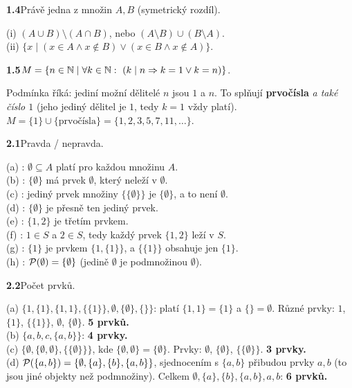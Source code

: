 \documentclass[11pt,a4paper]{article}
\newcommand{\zad}[2]{\par\Needspace*{4cm}\vspace{1.1em}\noindent\textcolor{accent}{\sffamily\bfseries #1}\enspace #2\par}
\begin{document}
\zad{1.4}{Právě jedna z množin $A,B$ (symetrický rozdíl).}
\begin{reseni}
(i) $(A\cup B)\setminus(A\cap B)$, nebo $(A\setminus B)\cup(B\setminus A)$.\\
(ii) $\{x\mid(x\in A\land x\notin B)\lor(x\in B\land x\notin A)\}$.
\end{reseni}

\zad{1.5}{$M=\{n\in\mathbb N\mid\forall k\in\mathbb N:\ (k\mathrel{\mid} n\Rightarrow k=1\lor k=n)\}$.}
\begin{reseni}
Podmínka říká: jediní možní dělitelé $n$ jsou $1$ a $n$. To splňují \textbf{prvočísla} \emph{a také číslo $1$} (jeho jediný dělitel je $1$, tedy $k=1$ vždy platí). $M=\{1\}\cup\{\text{prvočísla}\}=\{1,2,3,5,7,11,\dots\}$.
\end{reseni}


\zad{2.1}{Pravda / nepravda.}
\begin{reseni}
(a) \pravda: $\emptyset\subseteq A$ platí pro každou množinu $A$.\\
(b) \nepravda: $\{\emptyset\}$ má prvek $\emptyset$, který neleží v $\emptyset$.\\
(c) \nepravda: jediný prvek množiny $\{\{\emptyset\}\}$ je $\{\emptyset\}$, a to není $\emptyset$.\\
(d) \pravda: $\{\emptyset\}$ je přesně ten jediný prvek.\\
(e) \pravda: $\{1,2\}$ je třetím prvkem.\\
(f) \pravda: $1\in S$ a $2\in S$, tedy každý prvek $\{1,2\}$ leží v $S$.\\
(g) \pravda: $\{1\}$ je prvkem $\{1,\{1\}\}$, a $\{\{1\}\}$ obsahuje jen $\{1\}$.\\
(h) \pravda: $\mathcal P(\emptyset)=\{\emptyset\}$ (jedině $\emptyset$ je podmnožinou $\emptyset$).
\end{reseni}

\zad{2.2}{Počet prvků.}
\begin{reseni}
(a) $\{1,\{1\},\{1,1\},\{\{1\}\},\emptyset,\{\emptyset\},\{\}\}$: platí $\{1,1\}=\{1\}$ a $\{\}=\emptyset$. Různé prvky: $1$, $\{1\}$, $\{\{1\}\}$, $\emptyset$, $\{\emptyset\}$. \textbf{5 prvků.}\\
(b) $\{a,b,c,\{a,b\}\}$: \textbf{4 prvky.}\\
(c) $\{\emptyset,\{\emptyset,\emptyset\},\{\{\emptyset\}\}\}$, kde $\{\emptyset,\emptyset\}=\{\emptyset\}$. Prvky: $\emptyset$, $\{\emptyset\}$, $\{\{\emptyset\}\}$. \textbf{3 prvky.}\\
(d) $\mathcal P(\{a,b\})=\{\emptyset,\{a\},\{b\},\{a,b\}\}$, sjednocením s $\{a,b\}$ přibudou prvky $a,b$ (to jsou jiné objekty než podmnožiny). Celkem $\emptyset,\{a\},\{b\},\{a,b\},a,b$: \textbf{6 prvků.}
\end{reseni}
\end{document}
